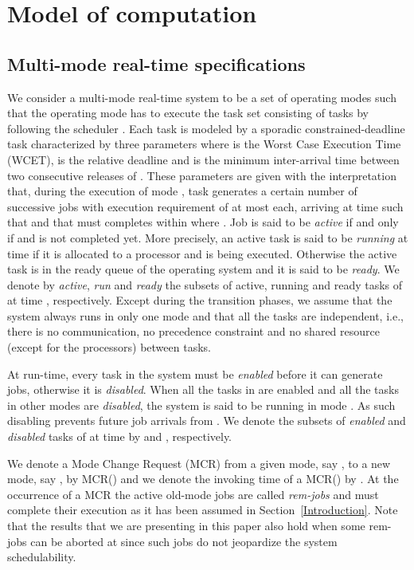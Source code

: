 \documentclass[10pt,english,a4paper]{article}
\newtheorem{validity test}{Validity Test}
\begin{document}
\section{Model of computation}\label{Model}

\subsection{Multi-mode real-time specifications}

We consider a multi-mode real-time system to be a set of  operating modes  such that the operating mode  has to execute the task set  consisting of  tasks by following the scheduler . Each task  is modeled by a sporadic constrained-deadline task characterized by three parameters  where  is the Worst Case Execution Time (WCET),  is the relative deadline and  is the minimum inter-arrival time between two consecutive releases of . These parameters are given with the interpretation that, during the execution of mode , task  generates a certain number of successive jobs  with execution requirement of at most  each, arriving at time  such that  and that must completes within  where . Job  is said to be {\em active} if and only if  and is not completed yet. More precisely, an active task is said to be {\em running} at time  if it is allocated to a processor and is being executed. Otherwise the active task is in the ready queue of the operating system and it is said to be {\em ready}. We denote by {\em active}, {\em run} and {\em ready} the subsets of active, running and ready tasks of  at time , respectively. Except during the transition phases, we assume that the system always runs in only one mode and that all the tasks are independent, i.e., there is no communication, no precedence constraint and no shared resource (except for the processors) between tasks. 

At run-time, every task in the system must be {\em enabled} before it can generate jobs, otherwise it is {\em disabled}. When all the tasks in  are enabled and all the tasks in other modes are {\em disabled}, the system is said to be running in mode . As such disabling  prevents future job arrivals from . We denote the subsets of {\em enabled} and {\em disabled} tasks of  at time  by  and , respectively.

We denote a Mode Change Request (MCR) from a given mode, say , to a new mode, say , by MCR() and we denote the invoking time of a MCR() by . At the occurrence of a MCR the active old-mode jobs are called {\em rem-jobs} and must complete their execution as it has been assumed in Section~\ref{Introduction}. Note that the results that we are presenting in this paper also hold when some rem-jobs can be aborted at  since such jobs do not jeopardize the system schedulability. 
\end{document}
